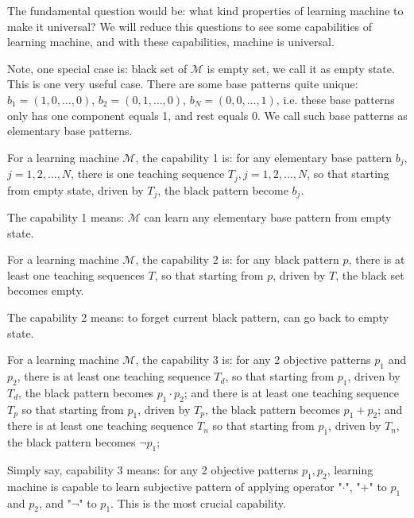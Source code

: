 The fundamental question would be: what kind properties of learning machine to make it universal? We will reduce this questions to see some capabilities of learning machine, and with these capabilities, machine is universal.

Note, one special case is: black set of  $\mathcal{M}$ is empty set, we call it as empty state. This is one very useful case. There are some base patterns quite unique: $b_1 = (1, 0, \ldots, 0)$, $b_2 = (0, 1, \ldots, 0)$, $b_N = (0, 0, \ldots, 1)$, i.e. these base patterns only has one component equals 1, and rest equals 0. We call such base patterns as elementary base patterns. 


\begin{definition}
For a learning machine $\mathcal{M}$, the capability 1 is: for any elementary base pattern $b_j$, $j=1, 2, \ldots, N$, there is one teaching sequence $T_j, j= 1, 2, \ldots, N$, so that starting from empty state, driven by $T_j$, the black pattern become $b_j$.
\end{definition}
The capability 1 means: $\mathcal{M}$ can learn any elementary base pattern  from empty state.   



\begin{definition}
For a learning machine $\mathcal{M}$, the capability 2 is: for any black pattern $p$, there is at least one teaching sequences $T$, so that starting from $p$, driven by $T$, the black set becomes empty.
\end{definition}
The capability 2 means: to forget current black pattern, can go back to empty state.



\begin{definition}
For a learning machine $\mathcal{M}$, the capability 3 is: for any 2 objective patterns $p_1$ and $p_2$, there is at least one teaching sequence $T_d$, so that starting from $p_1$, driven by $T_d$, the black pattern becomes $p_1 \cdot p_2$; and there is at least one teaching sequence
$T_p$ so that starting from $p_1$, driven by $T_p$, the black pattern becomes $p_1 + p_2$; and there is at least one teaching sequence
$T_n$ so that starting from $p_1$, driven by $T_n$, the black pattern becomes $\neg p_1$;
\end{definition}
Simply say, capability 3 means: for any 2 objective patterns $p_1, p_2$, learning machine is capable to learn subjective pattern of applying operator "$\cdot$", "+" to $p_1$ and $p_2$, and "$\neg$" to $p_1$. This is the most crucial capability. 

